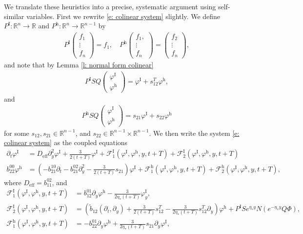 \documentclass[11pt]{article}
\newcommand{\R}{\mathbb{R}}
\renewcommand{\phi}{\varphi}
\numberwithin{equation}{section}
\numberwithin{prop}{section}
\newcommand{\phih}{\phi^\mathrm{h}}
\newcommand{\Deff}{D_\mathrm{eff}}
\newcommand{\phiI}{\phi^\mathrm{I}}
\newcommand{\FI}{\mathcal{F}^\mathrm{I}}
\newcommand{\Fh}{\mathcal{F}^\mathrm{h}}
\newcommand{\PI}{P^\mathrm{I}}
\newcommand{\Ph}{P^\mathrm{h}}
\begin{document}
We translate these heuristics into a precise, systematic argument using self-similar variables. First we rewrite \eqref{e: colinear system} slightly. We define $P^\mathrm{I}: \R^n \to \R$ and $P^\mathrm{h}:\R^n \to \R^{n-1}$ by 
\begin{align}
P^\mathrm{I} \begin{pmatrix} f_1 \\ \vdots \\ f_n \end{pmatrix} = f_1, \quad P^\mathrm{h} \begin{pmatrix} f_1, \\ \vdots\\  f_n \end{pmatrix} = \begin{pmatrix}f_2 \\ \vdots \\ f_n \end{pmatrix},
\end{align}
and note that by Lemma \ref{l: normal form colinear} 
\begin{align}
\PI S Q \begin{pmatrix} \phiI \\ \phih \end{pmatrix} = \phiI + s_{12}^T \phih,
\end{align}
and 
\begin{align}
\Ph SQ \begin{pmatrix} \phiI \\ \phih \end{pmatrix} = s_{21} \phiI + s_{22} \phih 
\end{align}
for some $s_{12}, s_{21} \in \R^{n-1}$, and $s_{22} \in \R^{n-1} \times \R^{n-1}$. We then write the system \eqref{e: colinear system} as the coupled equations
\begin{align}
\partial_t \phiI &= \Deff \partial_y^2 \phiI + \frac{3}{2 (t+T)} \phiI + \FI_1 (\phiI, \phih, y, t+T) + \FI_2  (\phiI, \phih, y, t+T) \label{e: colinear phiI eqn}\\
b_{22}^{00} \phih &= \left( - b_{21}^{10} \partial_t - b_{21}^{02} \partial_y^2 - \frac{3}{2 (t+T)} s_{21} \right) \phiI + \Fh_1  (\phiI, \phih, y, t+T) + \Fh_2  (\phiI, \phih, y, t+T), \label{e: colinear phih eqn}
\end{align}
where $\Deff = b_{11}^{02}$, and
\begin{align}
\FI_1  (\phiI, \phih, y, t+T) &= b_{12}^{01} \partial_y \phih - \frac{3}{2 \eta_* (t+T)} \phiI_y, \\
\FI_2  (\phiI, \phih, y, t+T) &= \left( \tilde{b}_{12} (\partial_t, \partial_y)  + \frac{3}{2(t+T)} s_{12}^T - \frac{3}{2 \eta_* (t+T)} s_{12}^T \partial_y \right) \phih + \PI S e^{\eta_* y} N \left( e^{-\eta_* y} Q \Phi \right), \\
\Fh_1  (\phiI, \phih, y, t+T) &= - b_{22}^{01} \partial_y \phih + \frac{3}{2 \eta_* (t+T)} s_{21} \partial_y \phiI,
\end{align}
\end{document}
